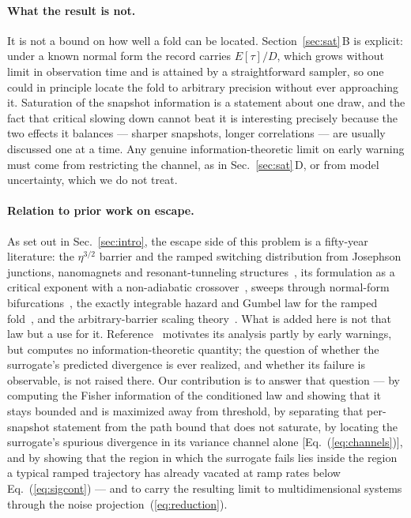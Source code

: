 \documentclass[%
 twocolumn,
 superscriptaddress,
 amsmath,amssymb,
 aps,
 pre,
 floatfix,
]{revtex4-2}
\begin{document}
\paragraph{What the result is not.}
It is not a bound on how well a fold can be located.  Section~\ref{sec:sat}\,B is explicit: under a known normal form the record carries $E[\tau]/D$, which grows without limit in observation time and is attained by a straightforward sampler, so one could in principle locate the fold to arbitrary precision without ever approaching it.  Saturation of the snapshot information is a statement about one draw, and the fact that critical slowing down cannot beat it is interesting precisely because the two effects it balances --- sharper snapshots, longer correlations --- are usually discussed one at a time.  Any genuine information-theoretic limit on early warning must come from restricting the channel, as in Sec.~\ref{sec:sat}\,D, or from model uncertainty, which we do not treat.

\paragraph{Relation to prior work on escape.}
As set out in Sec.~\ref{sec:intro}, the escape side of this problem is a fifty-year literature: the $\eta^{3/2}$ barrier and the ramped switching distribution from Josephson junctions, nanomagnets and resonant-tunneling structures~\cite{Kurkijarvi1972,FultonDunkelberger1974,DykmanKrivoglaz1980,Victora1989,Garg1995,Tretiakov2003}, its formulation as a critical exponent with a non-adiabatic crossover~\cite{DykmanGoldingRyvkine2004,RyvkineDykmanGolding2004}, sweeps through normal-form bifurcations~\cite{MillerShaw2012}, the exactly integrable hazard and Gumbel law for the ramped fold~\cite{HerbertBouchet2017}, and the arbitrary-barrier scaling theory~\cite{HathcockSethna2021}.  What is added here is not that law but a use for it.  Reference~\cite{HerbertBouchet2017} motivates its analysis partly by early warnings, but computes no information-theoretic quantity; the question of whether the surrogate's predicted divergence is ever realized, and whether its failure is observable, is not raised there.  Our contribution is to answer that question --- by computing the Fisher information of the conditioned law and showing that it stays bounded and is maximized away from threshold, by separating that per-snapshot statement from the path bound that does not saturate, by locating the surrogate's spurious divergence in its variance channel alone [Eq.~(\ref{eq:channels})], and by showing that the region in which the surrogate fails lies inside the region a typical ramped trajectory has already vacated at ramp rates below Eq.~(\ref{eq:sigcont}) --- and to carry the resulting limit to multidimensional systems through the noise projection~(\ref{eq:reduction}).
\end{document}
